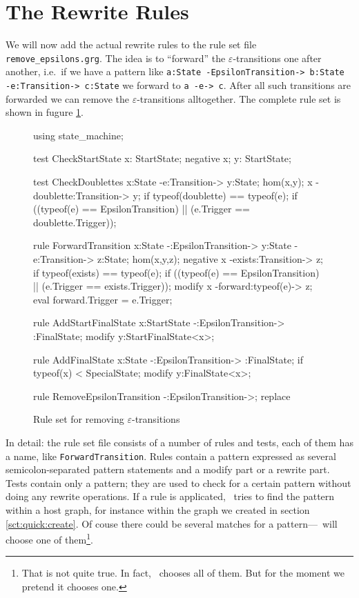 \section{The Rewrite Rules}
We will now add the actual rewrite rules to the rule set file \texttt{remove\_epsilons.grg}.
The idea is to ``forward'' the $\varepsilon$-transitions one after another, i.e.\ if we have a pattern like \texttt{a:State -EpsilonTransition-> b:State -e:Transition-> c:State} we forward to \texttt{a -e-> c}.
After all such transitions are forwarded we can remove the $\varepsilon$-transitions alltogether.
The complete rule set is shown in fugure \ref{fig:quick:ruleset}.
\begin{figure}[htbp]
	\centering
	\begin{grgen}
using state_machine;

test CheckStartState {
    x: StartState;
    negative {
        x;
        y: StartState;
    }
}

test CheckDoublettes {
    x:State -e:Transition-> y:State;
    hom(x,y);
    x -doublette:Transition-> y;
    if { typeof(doublette) == typeof(e); }
    if { ((typeof(e) == EpsilonTransition) || (e.Trigger == doublette.Trigger)); }
}

rule ForwardTransition {
    x:State -:EpsilonTransition-> y:State -e:Transition-> z:State;
    hom(x,y,z);
    negative {
        x -exists:Transition-> z;
        if { typeof(exists) == typeof(e); }
        if { ((typeof(e) == EpsilonTransition) || (e.Trigger == exists.Trigger)); }
    }
    modify {
        x -forward:typeof(e)-> z;
        eval { forward.Trigger = e.Trigger; }
    }    
}

rule AddStartFinalState {
    x:StartState -:EpsilonTransition-> :FinalState;
    modify {
        y:StartFinalState<x>;        
    }
}

rule AddFinalState {
    x:State -:EpsilonTransition-> :FinalState;
    if { typeof(x) < SpecialState; }
    modify {
        y:FinalState<x>;
    }
}

rule RemoveEpsilonTransition {
    -:EpsilonTransition->;
    replace {}   
}	
	\end{grgen}
	\caption{Rule set for removing $\varepsilon$-transitions}
	\label{fig:quick:ruleset}
\end{figure}

In detail: the rule set file consists of a number of rules and tests, each of them has a name, like \texttt{ForwardTransition}.
Rules contain a pattern expressed as several semicolon-separated pattern statements and a modify part or a rewrite part.
Tests contain only a pattern; they are used to check for a certain pattern without doing any rewrite operations.
If a rule is applicated, \GrG\ tries to find the pattern within a host graph, for instance within the graph we created in section \ref{sct:quick:create}.
Of couse there could be several matches for a pattern---\GrG\ will choose one of them\footnote{That is not quite true. In fact, \GrG\ chooses all of them. But for the moment we pretend it chooses one.}.

